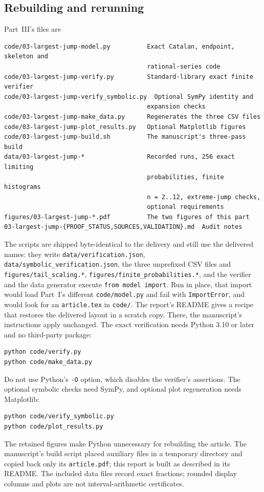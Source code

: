\documentclass[11pt,a4paper]{article}
\theoremstyle{definition}\newaliascnt{definition}{theorem}
\theoremstyle{remark}\newaliascnt{remark}{theorem}
\begin{document}
\subsection{Rebuilding and rerunning}
\label{lj:sec:reproduce}
Part~III's files are
\begin{lstlisting}
code/03-largest-jump-model.py          Exact Catalan, endpoint, skeleton and
                                       rational-series code
code/03-largest-jump-verify.py         Standard-library exact finite verifier
code/03-largest-jump-verify_symbolic.py  Optional SymPy identity and
                                       expansion checks
code/03-largest-jump-make_data.py      Regenerates the three CSV files
code/03-largest-jump-plot_results.py   Optional Matplotlib figures
code/03-largest-jump-build.sh          The manuscript's three-pass build
data/03-largest-jump-*                 Recorded runs, 256 exact limiting
                                       probabilities, finite histograms
                                       n = 2..12, extreme-jump checks,
                                       optional requirements
figures/03-largest-jump-*.pdf          The two figures of this part
03-largest-jump-{PROOF_STATUS,SOURCES,VALIDATION}.md  Audit notes
\end{lstlisting}
The scripts are shipped byte-identical to the delivery and still use the
delivered names: they write \texttt{data/verification.json},
\texttt{data/symbolic\_verification.json}, the three unprefixed CSV files
and \texttt{figures/tail\_scaling.*}, \texttt{figures/finite\_probabilities.*},
and the verifier and the data generator execute \texttt{from model import}.
Run in place, that import would load Part~I's different
\texttt{code/model.py} and fail with \texttt{ImportError}, and
 would look for an \texttt{article.tex}
in \texttt{code/}. The report's README gives a recipe that restores the
delivered layout in a scratch copy. There, the manuscript's instructions
apply unchanged. The exact verification needs Python 3.10 or later and no
third-party package:
\begin{verbatim}
python code/verify.py
python code/make_data.py
\end{verbatim}
Do not use Python's \texttt{-O} option, which disables the verifier's
assertions. The optional symbolic checks need SymPy, and optional plot
regeneration needs Matplotlib:
\begin{verbatim}
python code/verify_symbolic.py
python code/plot_results.py
\end{verbatim}
The retained figures make Python unnecessary for rebuilding the article.
The manuscript's build script placed auxiliary files in a temporary
directory and copied back only its \texttt{article.pdf}; this report is built
as described in its README. The included data files record exact fractions;
rounded display columns and plots are not interval-arithmetic certificates.
\end{document}
